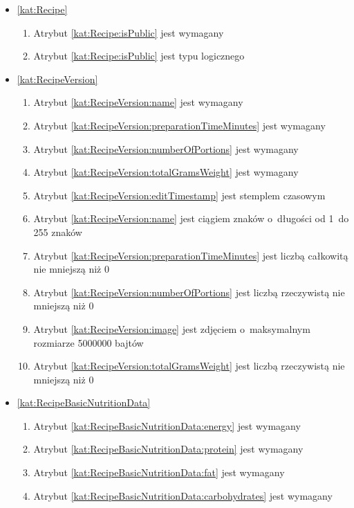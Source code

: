 \begin{itemize}[label={\textbf{Ograniczenia dla}}, wide, labelwidth=!, labelindent=0pt]
    \setlength\itemsep{1.75em}
    \item\ref{kat:Recipe}\mynobreakpar
    \begin{enumerate}[label={\textbf{OGR/2/\protect\twodigits{\arabic{enumi}}}}, wide, labelwidth=!, align=left, leftmargin=3cm]
        \item Atrybut \ref{kat:Recipe:isPublic} jest wymagany

        \item Atrybut \ref{kat:Recipe:isPublic} jest typu logicznego
    \end{enumerate}

    \item\ref{kat:RecipeVersion}\mynobreakpar
    \begin{enumerate}[label={\textbf{OGR/2/\protect\twodigits{\arabic{enumi}}}}, wide, labelwidth=!, align=left, leftmargin=3cm, resume]
        \item Atrybut \ref{kat:RecipeVersion:name} jest wymagany
        \item Atrybut \ref{kat:RecipeVersion:preparationTimeMinutes} jest wymagany
        \item Atrybut \ref{kat:RecipeVersion:numberOfPortions} jest wymagany
        \item Atrybut \ref{kat:RecipeVersion:totalGramsWeight} jest wymagany

        \item Atrybut \ref{kat:RecipeVersion:editTimestamp} jest stemplem czasowym
        \item Atrybut \ref{kat:RecipeVersion:name} jest ciągiem znaków o~długości od 1~do 255 znaków
        \item Atrybut \ref{kat:RecipeVersion:preparationTimeMinutes} jest liczbą całkowitą nie mniejszą niż 0
        \item Atrybut \ref{kat:RecipeVersion:numberOfPortions} jest liczbą rzeczywistą nie mniejszą niż 0
        \item Atrybut \ref{kat:RecipeVersion:image} jest zdjęciem o~maksymalnym rozmiarze 5000000 bajtów
        \item Atrybut \ref{kat:RecipeVersion:totalGramsWeight} jest liczbą rzeczywistą nie mniejszą niż 0
    \end{enumerate}

    \item\ref{kat:RecipeBasicNutritionData}\mynobreakpar
    \begin{enumerate}[label={\textbf{OGR/2/\protect\twodigits{\arabic{enumi}}}}, wide, labelwidth=!, align=left, leftmargin=3cm, resume]
        \item Atrybut \ref{kat:RecipeBasicNutritionData:energy} jest wymagany
        \item Atrybut \ref{kat:RecipeBasicNutritionData:protein} jest wymagany
        \item Atrybut \ref{kat:RecipeBasicNutritionData:fat} jest wymagany
        \item Atrybut \ref{kat:RecipeBasicNutritionData:carbohydrates} jest wymagany


\end{enumerate}
\end{itemize}
